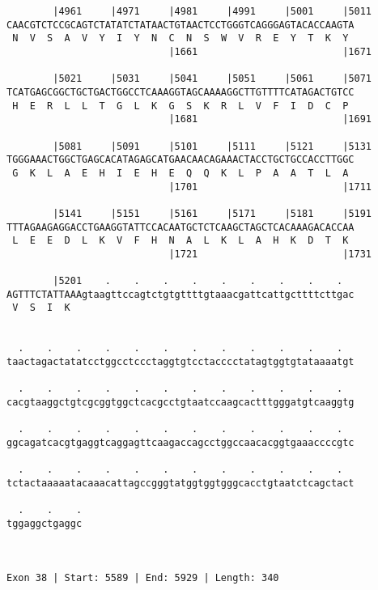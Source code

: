 \documentclass{article}
\begin{document}
\begin{Verbatim}
        |4961     |4971     |4981     |4991     |5001     |5011
CAACGTCTCCGCAGTCTATATCTATAACTGTAACTCCTGGGTCAGGGAGTACACCAAGTA
 N  V  S  A  V  Y  I  Y  N  C  N  S  W  V  R  E  Y  T  K  Y 
                            |1661                         |1671
  
        |5021     |5031     |5041     |5051     |5061     |5071
TCATGAGCGGCTGCTGACTGGCCTCAAAGGTAGCAAAAGGCTTGTTTTCATAGACTGTCC
 H  E  R  L  L  T  G  L  K  G  S  K  R  L  V  F  I  D  C  P 
                            |1681                         |1691
  
        |5081     |5091     |5101     |5111     |5121     |5131
TGGGAAACTGGCTGAGCACATAGAGCATGAACAACAGAAACTACCTGCTGCCACCTTGGC
 G  K  L  A  E  H  I  E  H  E  Q  Q  K  L  P  A  A  T  L  A 
                            |1701                         |1711
  
        |5141     |5151     |5161     |5171     |5181     |5191
TTTAGAAGAGGACCTGAAGGTATTCCACAATGCTCTCAAGCTAGCTCACAAAGACACCAA
 L  E  E  D  L  K  V  F  H  N  A  L  K  L  A  H  K  D  T  K 
                            |1721                         |1731
  
        |5201    .    .    .    .    .    .    .    .    .  
AGTTTCTATTAAAgtaagttccagtctgtgttttgtaaacgattcattgcttttcttgac
 V  S  I  K                                                 
                                                            
  
  .    .    .    .    .    .    .    .    .    .    .    .  
taactagactatatcctggcctccctaggtgtcctacccctatagtggtgtataaaatgt
                                                            
  .    .    .    .    .    .    .    .    .    .    .    .  
cacgtaaggctgtcgcggtggctcacgcctgtaatccaagcactttgggatgtcaaggtg
                                                            
  .    .    .    .    .    .    .    .    .    .    .    .  
ggcagatcacgtgaggtcaggagttcaagaccagcctggccaacacggtgaaaccccgtc
                                                            
  .    .    .    .    .    .    .    .    .    .    .    .  
tctactaaaaatacaaacattagccgggtatggtggtgggcacctgtaatctcagctact
                                                            
  .    .    .
tggaggctgaggc
             
             
 
Exon 38 | Start: 5589 | End: 5929 | Length: 340




\end{Verbatim}
\end{document}
